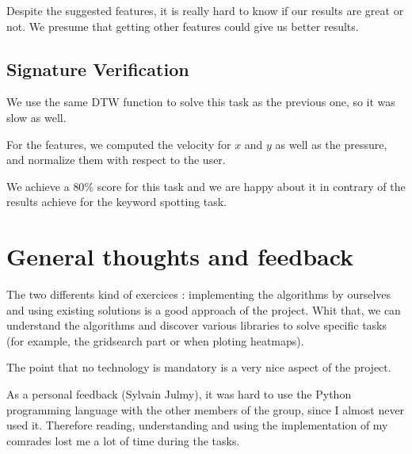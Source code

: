 \documentclass[a4paper,11pt]{report}
\begin{document}
Despite the suggested features, it is really hard to know if our results are
great or not. We presume that getting other features could give us better
results.

\subsection*{Signature Verification}

We use the same DTW function to solve this task as the previous one, so it was
slow as well.

For the features, we computed the velocity for $x$ and $y$ as well as the
pressure, and normalize them with respect to the user.

We achieve a $80\%$ score for this task and we are happy about it in contrary of
the results achieve for the keyword spotting task.

\newpage

\section*{General thoughts and feedback}

The two differents kind of exercices : implementing the algorithms by ourselves and using
existing solutions is a good approach of the project. Whit that, we can
understand the algorithms and discover various libraries to solve specific tasks
(for example, the gridsearch part or when ploting heatmaps).

The point that no technology is mandatory is a very nice aspect of the project.

As a personal feedback (Sylvain Julmy), it was hard to use the Python
programming language with the other members of the group, since I almost never
used it. Therefore reading, understanding and using the implementation of my
comrades lost me a lot of time during the tasks.
\end{document}
